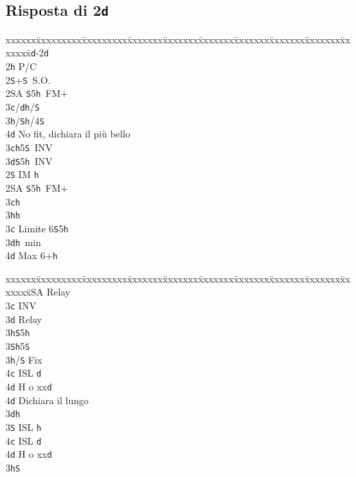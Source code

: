 \documentclass[a4paper,italian]{article}
\newcommand{\BS}{\small{\texttt{S}}}
\newcommand{\BC}{\small{\texttt{c}}}
\newcommand{\BD}{\small{\texttt{d}}}
\newcommand{\BH}{\small{\texttt{h}}}
\newcommand{\pdfd}{\texorpdfstring{\texttt{d}}{D}}
\newenvironment{bidtable}
{\begin{tabbing}

    xxxxxx\=xxxxxxxxx\=xxxxxxxxx\=xxxxxxx\=xxxxxxx\=xxxxxxx\=xxxxxxx\=xxxxxxx\=xxxxxxx\=xxxxxxx\=\kill}
{\end{tabbing} }%
\begin{document}
\subsection{Risposta di 2\pdfd}

\begin{multicols}{2}

    \begin{bidtable}
        1\BD-2\BD\+\\
        2\BH \> P/C\+\\
        2\BS {}+\BS\ S.O.\\
        2\small{SA} \BS 5\BH\ FM+\+\\
        3\BC/\BD {}\BH /\BS \\
        3\BH/\BS {}\BH /4\BS \\
        4\BD \> No fit, dichiara il più bello\-\\
        3\BC {}\BH 5\BS\ INV\\
        3\BD {}\BS 5\BH\ INV\-\\
        2\BS \> IM \BH \+\\
        2\small{SA} \BS 5\BH\ FM+\+\\
        3\BC {}\BH \\
        3\BH {}\BH \-\\
        3\BC \> Limite 6\BS 5\BH \\
        3\BD {}\BH\ min\\
        4\BD \> Max 6+\BH \-\\
    \end{bidtable}
    \columnbreak
    \begin{bidtable}
        2\small{SA} \> Relay\+\\
        3\BC {} INV\+\\
        3\BD \> Relay\+\\
        3\BH {}\BS 5\BH \\
        3\BS {}\BH 5\BS \-\\
        3\BH/\BS \> Fix\\
        4\BC \> ISL \BD \+\\
        4\BD \> H o xx\BD \-\\
        4\BD \> Dichiara il lungo\-\\
        3\BD {}\BH \+\\
        3\BS \> ISL \BH \\
        4\BC \> ISL \BD \+\\
        4\BD \> H o xx\BD \-\-\\
        3\BH {}\BS \+\\

\end{bidtable}
\end{multicols}
\end{document}
